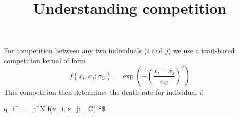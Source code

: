 \documentclass[
]{article}
\title{Understanding competition}
\author{}
\date{\vspace{-2.5em}}
\begin{document}
\maketitle

For competition between any two individuals (\(i\) and \(j\)) we use a
trait-based competition kernal of form \[
f(x_i, x_j; \sigma_C) = \exp\left(-\left(\frac{x_i - x_j}{\sigma_C}\right)^2\right)
\] This competition then determines the death rate for individual \(i\):

q\_i\^{} =  \sum\_j\^{}N f(x\_i, x\_j;
\sigma\_C) \$\$
\end{document}
